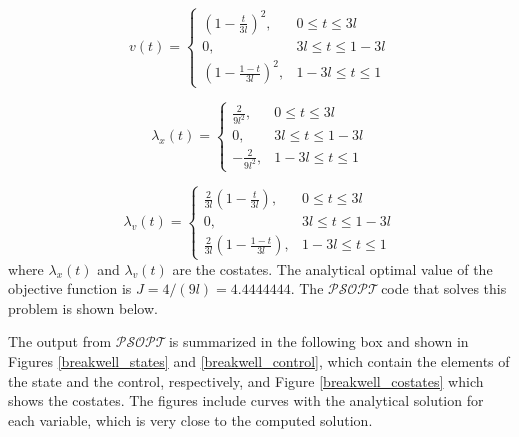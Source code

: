\documentclass[a4paper,11pt]{report}    %
\newcommand{\psopt}{$\mathcal{PSOPT}$\,}  %
\newenvironment{shadedframe}{%
  \def\FrameCommand{\fcolorbox{black}{shadecolor}}%
  \MakeFramed {\FrameRestore}}
{\endMakeFramed}
\begin{document}
\begin{equation}
 v(t) = \left\{  \begin{matrix} \left(1-\frac{t}{3l}\right)^2, & 0 \le t \le 3l \\ 0, & 3l \le t \le 1-3l \\  \left(1-\frac{1-t}{3l}\right)^2 ,   & 1-3l \le t \le 1 \end{matrix}  \right.
\end{equation}


\begin{equation}
 \lambda_x(t) = \left\{  \begin{matrix} \frac{2}{9l^2}, & 0 \le t \le 3l \\ 0, & 3l \le t \le 1-3l \\  -\frac{2}{9l^2}, & 1-3l \le t \le 1 \end{matrix}  \right.
\end{equation}

\begin{equation}
 \lambda_v(t) = \left\{  \begin{matrix} \frac{2}{3l}(1-\frac{t}{3l}), & 0 \le t \le 3l \\ 0, & 3l \le t \le 1-3l \\  \frac{2}{3l}(1-\frac{1-t}{3l}), & 1-3l \le t \le 1 \end{matrix}  \right.
\end{equation}
where $\lambda_x(t)$ and $\lambda_v(t)$ are the costates. The analytical optimal value of the objective function is $J= 4/(9l) = 4.4444444$. The
\psopt code that solves this problem is shown below.  


\tiny
\begin{shadedframe}

\end{shadedframe}
\normalsize

The output from \psopt is summarized in  the following box and shown in Figures \ref{breakwell_states} and \ref{breakwell_control}, which contain the elements of the state and the control, respectively,
and Figure \ref{breakwell_costates} which shows the costates. The figures include curves with the analytical solution for each variable, which is very close to the computed solution.

\begin{shadedframe}

\end{shadedframe}
\end{document}

